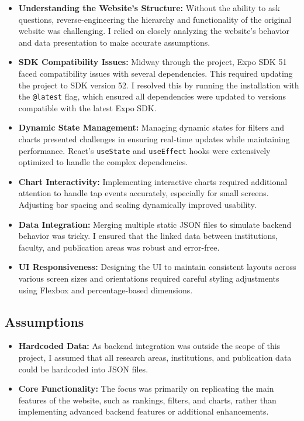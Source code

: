 \documentclass[12pt]{article}
\begin{document}
\begin{itemize}
    \item \textbf{Understanding the Website's Structure:} 
    Without the ability to ask questions, reverse-engineering the hierarchy and functionality of the original website was challenging. I relied on closely analyzing the website's behavior and data presentation to make accurate assumptions.
    
    \item \textbf{SDK Compatibility Issues:}
    Midway through the project, Expo SDK 51 faced compatibility issues with several dependencies. This required updating the project to SDK version 52. I resolved this by running the installation with the \texttt{@latest} flag, which ensured all dependencies were updated to versions compatible with the latest Expo SDK.
    
    \item \textbf{Dynamic State Management:}
    Managing dynamic states for filters and charts presented challenges in ensuring real-time updates while maintaining performance. React's \texttt{useState} and \texttt{useEffect} hooks were extensively optimized to handle the complex dependencies.
    
    \item \textbf{Chart Interactivity:}
    Implementing interactive charts required additional attention to handle tap events accurately, especially for small screens. Adjusting bar spacing and scaling dynamically improved usability.
    
    \item \textbf{Data Integration:}
    Merging multiple static JSON files to simulate backend behavior was tricky. I ensured that the linked data between institutions, faculty, and publication areas was robust and error-free.
    
    \item \textbf{UI Responsiveness:}
    Designing the UI to maintain consistent layouts across various screen sizes and orientations required careful styling adjustments using Flexbox and percentage-based dimensions.
\end{itemize}

\subsection{Assumptions}

\begin{itemize}
    \item \textbf{Hardcoded Data:}
    As backend integration was outside the scope of this project, I assumed that all research areas, institutions, and publication data could be hardcoded into JSON files.
    
    \item \textbf{Core Functionality:}
    The focus was primarily on replicating the main features of the website, such as rankings, filters, and charts, rather than implementing advanced backend features or additional enhancements.
\end{itemize}
\end{document}
